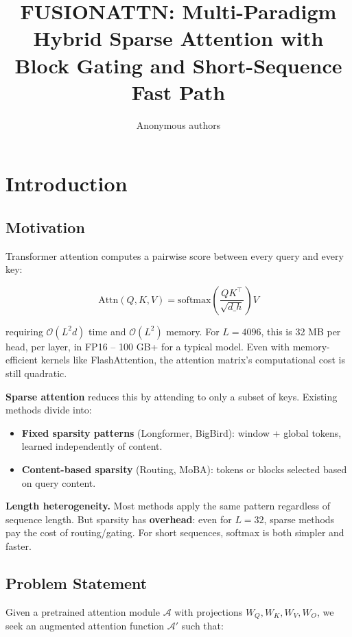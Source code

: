 \title{\textbf{FUSIONATTN: Multi-Paradigm Hybrid Sparse Attention with Block Gating and Short-Sequence Fast Path}}

\author{Anonymous authors}


\section{Introduction}

\subsection{Motivation}

Transformer attention computes a pairwise score between every query and 
every key:

\[
\text{Attn}(Q, K, V) = \text{softmax}\!\left(\frac{Q K^\top}{\sqrt{d\_h}}\right) V
\tag{1.1}
\]

requiring $\mathcal{O}(L^2 d)$ time and $\mathcal{O}(L^2)$ memory. For 
$L = 4096$, this is 32 MB per head, per layer, in FP16 -- 100 GB+ for a 
typical model. Even with memory-efficient kernels like FlashAttention, the 
attention matrix's computational cost is still quadratic.

\textbf{Sparse attention} reduces this by attending to only a subset of keys. 
Existing methods divide into:

\begin{itemize}
\item \textbf{Fixed sparsity patterns} (Longformer, BigBird): window + global tokens,
  learned independently of content.
\item \textbf{Content-based sparsity} (Routing, MoBA): tokens or blocks selected
  based on query content.

\end{itemize}
\textbf{Length heterogeneity.} Most methods apply the same pattern regardless of 
sequence length. But sparsity has \textbf{overhead}: even for $L = 32$, sparse 
methods pay the cost of routing/gating. For short sequences, softmax is 
both simpler and faster.

\subsection{Problem Statement}

Given a pretrained attention module $\mathcal{A}$ with projections 
$W_Q, W_K, W_V, W_O$, we seek an augmented attention function 
$\mathcal{A}'$ such that:

